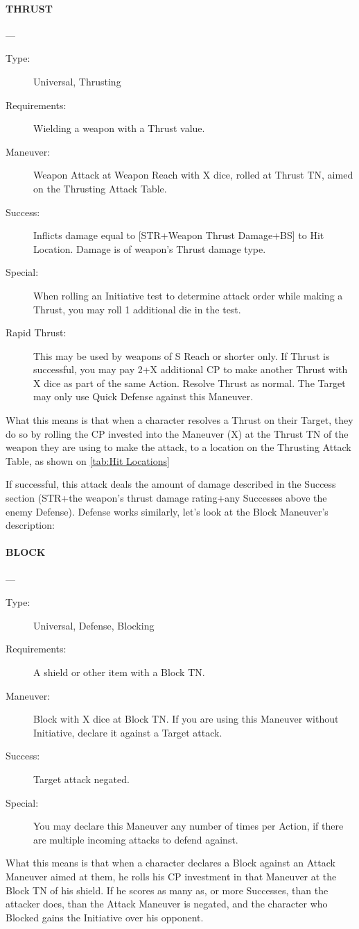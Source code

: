 \documentclass[oneside,11pt,english]{book}
\begin{document}
\paragraph{\large THRUST}---\quad{\large[X]}
	\begin{description}
		\item [Type:] Universal, Thrusting
		\item [Requirements:] Wielding a weapon with a Thrust value.
		\item [Maneuver:] Weapon Attack at Weapon Reach with X dice, rolled at Thrust TN, aimed on the Thrusting Attack Table.
		\item [Success:] Inflicts damage equal to [STR+Weapon Thrust Damage+BS] to Hit Location. Damage is of weapon’s Thrust damage type.
		\item [Special:] When rolling an Initiative test to determine attack order while making a Thrust, you may roll 1 additional die in the test.
		\item [Rapid Thrust:] This may be used by weapons of S Reach or shorter only. If Thrust is successful, you may pay 2+X additional CP to make another Thrust with X dice as part of the same Action. Resolve Thrust as normal. The Target may only use Quick Defense against this Maneuver.
	\end{description}

What this means is that when a character resolves a Thrust on their Target, they do so by rolling the CP invested into the Maneuver (X) at the Thrust TN of the weapon they are using to make the attack, to a location on the Thrusting Attack Table, as shown on \autoref{tab:Hit Locations} 

If successful, this attack deals the amount of damage described in the Success section (STR+the weapon’s thrust damage rating+any Successes above the enemy Defense).
Defense works similarly, let’s look at the Block Maneuver’s description:

\paragraph{\large BLOCK}---\quad{\large[X]}
	\begin{description}
		\item [Type:] Universal, Defense, Blocking
		\item [Requirements:] A shield or other item with a Block TN.
		\item [Maneuver:] Block with X dice at Block TN. If you are using this Maneuver without Initiative, declare it against a Target attack.
		\item [Success:] Target attack negated.
		\item [Special:] You may declare this Maneuver any number of times per Action, if there are multiple incoming attacks to defend against.
	\end{description}
What this means is that when a character declares a Block against an Attack Maneuver aimed at them, he rolls his CP investment in that Maneuver at the Block TN of his shield. If he scores as many as, or more Successes, than the attacker does, than the Attack Maneuver is negated, and the character who Blocked gains the Initiative over his opponent.
\end{document}
